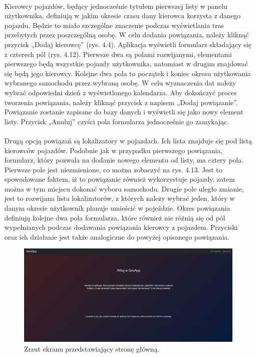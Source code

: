 \paragraph{}
Kierowcy pojazdów, będący jednocześnie tytułem pierwszej listy w panelu użytkownika, definiują w jakim okresie czasu dany kierowca korzysta z danego pojazdu. Będzie to miało szczególne znaczenie podczas wyświetlania tras przebytych przez poszczególną osobę. W celu dodania powiązania, należy kliknąć przycisk „Dodaj kierowcę” (rys. 4.4). Aplikacja wyświetli formularz składający się z czterech pól (rys. 4.12). Pierwsze dwa są polami rozwijanymi, elementami pierwszego będą wszystkie pojazdy użytkownika, natomiast w drugim znajdować się będą jego kierowcy. Kolejne dwa pola to początek i koniec okresu użytkowania wybranego samochodu przez wybraną osobę. W celu wyznaczenia dat należy wybrać odpowiedni dzień z wyświetlonego kalendarza. Aby dokończyć proces tworzenia powiązania, należy kliknąć przycisk z napisem „Dodaj powiązanie”. Powiązanie zostanie zapisane do bazy danych i wyświetli się jako nowy element listy. Przycisk „Anuluj” czyści pola formularza jednocześnie go zamykając.

\paragraph{}
Drugą opcją powiązań są lokalizatory w pojazdach. Ich lista znajduje się pod listą kierowców pojazdów. Podobnie jak w przypadku pierwszego powiązania, formularz, który pozwala na dodanie nowego elementu od listy, ma cztery pola. Pierwsze pole jest niezmienione, co można zobaczyć na rys. 4.13. Jest to spowodowane faktem, iż to powiązanie również wykorzystuje pojazdy, zatem można w tym miejscu dokonać wyboru samochodu. Drugie pole uległo zmianie, jest to rozwijana lista lokalizatorów, z których należy wybrać jeden, który w danym okresie użytkownik planuje umieścić w pojeździe. Okres powiązania definiują kolejne dwa pola formularza, które również nie różnią się od pól wypełnianych podczas dodawania powiązania kierowcy z pojazdem. Przyciski oraz ich działanie jest także analogiczne do powyżej opisanego powiązania.




\begin{figure}
	\centering
	\includegraphics[width=1\textwidth]{./graf/home_page.png}
	\caption{Zrzut ekranu przedstawiający stronę główną.}
	\label{fig:4.1}
\end{figure}

